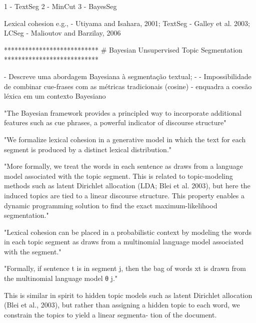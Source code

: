 



1 - TextSeg
2 - MinCut
3 - BayesSeg





Lexical cohesion e.g., 
	- Utiyama and Isahara,     2001; {TextSeg}
	- Galley et al.            2003; {LCSeg}
	- Malioutov and Barzilay,  2006  {}





***************************
# Bayesian Unsupervised Topic Segmentation
***************************

- Descreve uma abordagem Bayesiana à segmentação textual;
- 
- Impossibilidade de combinar cue-frases com as métricas tradicionais (cosine)
- {enquadra a coesão léxica em um contexto Bayesiano}

"The Bayesian framework provides a principled way to incorporate additional features such as cue phrases, a powerful indicator of discourse structure"


"We formalize lexical cohesion in a generative model in which the text for each segment is produced by a distinct lexical distribution." 


"More formally, we treat the words in each sentence as draws from a language model associated with the topic segment. This is related to topic-modeling methods such as latent Dirichlet allocation (LDA; Blei et al. 2003), but here the induced topics are tied to a linear discourse structure. This property enables a dynamic programming solution to find the exact maximum-likelihood segmentation." 



"Lexical cohesion can be placed in a probabilistic context by modeling the words in each topic segment as draws from a multinomial language model associated with the segment."

"Formally, if sentence t is in segment j, then the bag of words xt is drawn from the multinomial language model θ j."


This is similar in spirit to hidden topic models such
as latent Dirichlet allocation (Blei et al., 2003), but
rather than assigning a hidden topic to each word,
we constrain the topics to yield a linear segmenta-
tion of the document.

